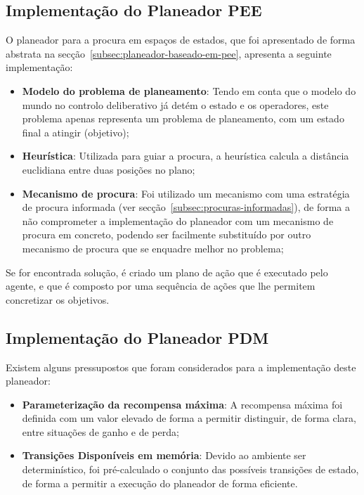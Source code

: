 \subsection{Implementação do Planeador PEE}\label{subsec:implementacao-planeador-pee}

O planeador para a procura em espaços de estados, que foi apresentado de forma abstrata na secção~\ref{subsec:planeador-baseado-em-pee},
apresenta a seguinte implementação:

\begin{itemize}
    \item \textbf{Modelo do problema de planeamento}: Tendo em conta que o modelo do mundo no controlo deliberativo já detém o estado e os operadores, este problema apenas representa um problema de planeamento, com um estado final a atingir (objetivo);
    \item \textbf{Heurística}: Utilizada para guiar a procura, a heurística calcula a distância euclidiana entre duas posições no plano;
    \item \textbf{Mecanismo de procura}: Foi utilizado um mecanismo com uma estratégia de procura informada (ver secção~\ref{subsec:procuras-informadas}), de forma a não comprometer a implementação do planeador com um mecanismo de procura em concreto, podendo ser facilmente substituído por outro mecanismo de procura que se enquadre melhor no problema;
\end{itemize}

Se for encontrada solução, é criado um plano de ação que é executado pelo agente, e que é composto por uma sequência de ações que lhe permitem concretizar os objetivos.

\subsection{Implementação do Planeador PDM}\label{subsec:implementacao-planeador-pdm}

Existem alguns pressupostos que foram considerados para a implementação deste planeador:

\begin{itemize}
    \item \textbf{Parameterização da recompensa máxima}: A recompensa máxima foi definida com um valor elevado de forma a permitir distinguir, de forma clara, entre situações de ganho e de perda;
    \item \textbf{Transições Disponíveis em memória}: Devido ao ambiente ser determinístico, foi pré-calculado o conjunto das possíveis transições de estado, de forma a permitir a execução do planeador de forma eficiente.
\end{itemize}

